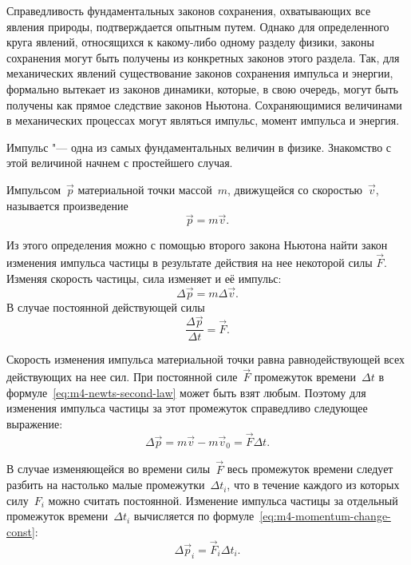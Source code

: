\documentclass[a4paper, 12pt]{extarticle}
\begin{document}
Справедливость фундаментальных законов сохранения, охватывающих все явления природы, подтверждается опытным путем. Однако для определенного круга явлений, относящихся к какому-либо одному разделу физики, законы сохранения могут быть получены из конкретных законов этого раздела. Так, для механических явлений существование законов сохранения импульса и энергии, формально вытекает из законов динамики, которые, в свою очередь, могут быть получены как прямое следствие законов Ньютона. %
Сохраняющимися величинами в механических процессах могут являться импульс, момент импульса и энергия.

Импульс "--- одна из самых фундаментальных величин в физике. Знакомство с этой величиной начнем с простейшего случая.

Импульсом~$\vec p$ материальной точки массой~$m$, движущейся со скоростью~$\vec v$, называется произведение
\begin{equation}
\label{eq:m4-momentum-definition}
\vec p = m \vec v.
\end{equation}

Из этого определения можно с помощью второго закона Ньютона найти закон изменения импульса частицы в результате действия на нее некоторой силы $\vec F$. Изменяя скорость частицы, сила изменяет и её импульс: \[
\Delta \vec p = m \Delta \vec v.
\] %
В случае постоянной действующей силы
\begin{equation}
\label{eq:m4-newts-second-law}
\frac{\Delta \vec p}{\Delta t} = \vec F.
\end{equation}

Скорость изменения импульса материальной точки равна равнодействующей всех действующих на нее сил. При постоянной силе~$\vec F$ промежуток времени~$\Delta t$ в формуле~\eqref{eq:m4-newts-second-law} может быть взят любым. Поэтому для изменения импульса частицы за этот промежуток справедливо
следующее выражение:
\begin{equation}
\label{eq:m4-momentum-change-const}
\Delta \vec p = m \vec v - m \vec v_0 = \vec F \Delta t.
\end{equation}

В случае изменяющейся во времени силы~$\vec F$ весь промежуток времени следует разбить на настолько малые промежутки~$\Delta t_i$, что в течение каждого из которых силу~$F_i$ можно считать постоянной. %
Изменение импульса частицы за отдельный промежуток времени~$\Delta t_i$ вычисляется по формуле~\eqref{eq:m4-momentum-change-const}:
\begin{equation}
\label{eq:m4-momentary-momentum-change}
\Delta \vec p_i = \vec F_i \Delta t_i.
\end{equation}
\end{document}
